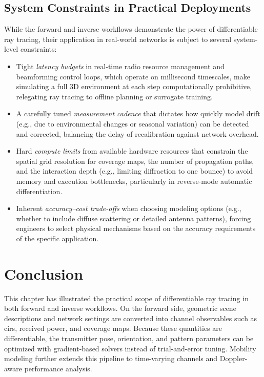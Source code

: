 \subsection{System Constraints in Practical Deployments}

While the forward and inverse workflows demonstrate the power of differentiable ray tracing, their application in real-world networks is subject to several system-level constraints:
\begin{itemize}
  \item Tight \emph{latency budgets} in real-time radio resource management and beamforming control loops, which operate on millisecond timescales, make simulating a full 3D environment at each step computationally prohibitive, relegating ray tracing to offline planning or surrogate training.
  \item A carefully tuned \emph{measurement cadence} that dictates how quickly model drift (e.g., due to environmental changes or seasonal variation) can be detected and corrected, balancing the delay of recalibration against network overhead.
  \item Hard \emph{compute limits} from available hardware resources that constrain the spatial grid resolution for coverage maps, the number of propagation paths, and the interaction depth (e.g., limiting diffraction to one bounce) to avoid memory and execution bottlenecks, particularly in reverse-mode automatic differentiation.
  \item Inherent \emph{accuracy--cost trade-offs} when choosing modeling options (e.g., whether to include diffuse scattering or detailed antenna patterns), forcing engineers to select physical mechanisms based on the accuracy requirements of the specific application.
\end{itemize}

\section{Conclusion}

This chapter has illustrated the practical scope of differentiable ray tracing in both forward and inverse workflows. On the forward side, geometric scene descriptions and network settings are converted into channel observables such as \glspl{cir}, received power, and coverage maps. Because these quantities are differentiable, the transmitter pose, orientation, and pattern parameters can be optimized with gradient-based solvers instead of trial-and-error tuning. Mobility modeling further extends this pipeline to time-varying channels and Doppler-aware performance analysis.

